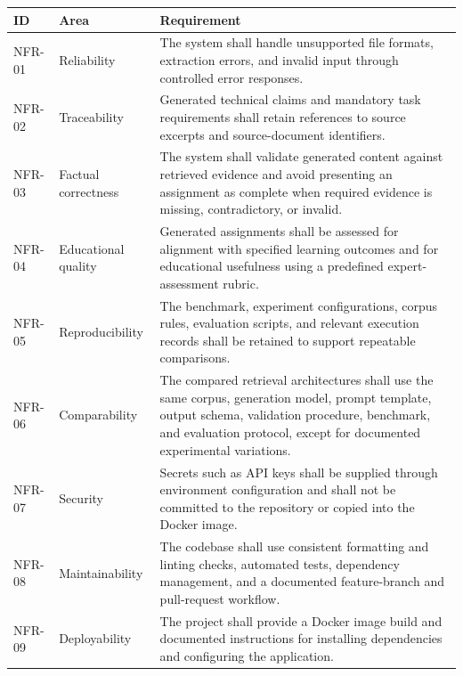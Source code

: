 \documentclass[12pt,a4paper]{article}
\begin{document}
\begin{table}[htbp]
\centering
\small
\renewcommand{\arraystretch}{1.3}
\begin{tabularx}{\textwidth}{|p{12mm}|p{33mm}|X|}
\hline
\textbf{ID} &
\textbf{Area} &
\textbf{Requirement} \\
\hline

NFR-01 &
Reliability &
The system shall handle unsupported file formats, extraction
errors, and invalid input through controlled error responses. \\
\hline

NFR-02 &
Traceability &
Generated technical claims and mandatory task requirements
shall retain references to source excerpts and source-document
identifiers. \\
\hline

NFR-03 &
Factual correctness &
The system shall validate generated content against retrieved
evidence and avoid presenting an assignment as complete when
required evidence is missing, contradictory, or invalid. \\
\hline

NFR-04 &
Educational quality &
Generated assignments shall be assessed for alignment with
specified learning outcomes and for educational usefulness
using a predefined expert-assessment rubric. \\
\hline

NFR-05 &
Reproducibility &
The benchmark, experiment configurations, corpus rules,
evaluation scripts, and relevant execution records shall be
retained to support repeatable comparisons. \\
\hline

NFR-06 &
Comparability &
The compared retrieval architectures shall use the same corpus,
generation model, prompt template, output schema, validation
procedure, benchmark, and evaluation protocol, except for
documented experimental variations. \\
\hline

NFR-07 &
Security &
Secrets such as API keys shall be supplied through environment
configuration and shall not be committed to the repository
or copied into the Docker image. \\
\hline

NFR-08 &
Maintainability &
The codebase shall use consistent formatting and linting
checks, automated tests, dependency management, and a
documented feature-branch and pull-request workflow. \\
\hline

NFR-09 &
Deployability &
The project shall provide a Docker image build and documented
instructions for installing dependencies and configuring
the application. \\
\hline


\end{tabularx}
\end{table}
\end{document}
